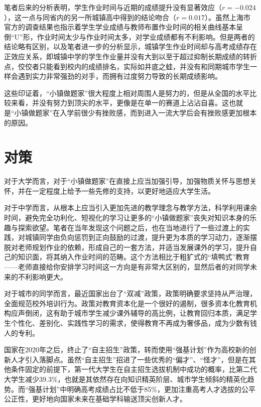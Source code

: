 \documentclass[10pt,a4paper,heading=false]{ctexart}
\begin{document}
    笔者后来的分析表明，学生作业时间与近期的成绩提升没有显著效应（$r=-0.024$）\cite{planstormrelation}，这一点与同省内的另一所城镇高中得到的结论吻合（$r=0.017$）\cite{phyquantity}。虽然上海市官方的调查结果也指示着学生学业成绩与教师布置作业时间的相关曲线基本呈倒“U”形，作业时间太少与作业时间太多，对学业成绩都有不利影响\cite{shanghaihome}。但是两者的结论略有区别，以及笔者进一步的分析显示，城镇学生作业时间却与高考成绩存在正效应关系\cite{planstormrelation}，即城镇中学的学生作业量并没有大到以至于超过抑制长期成绩的转折点，佼佼者只能看到校内的成绩排名，实际如井底之蛙，并没有和同期城市学生一样会遇到实力非常强劲的对手，而拥有过度努力导致的长期成绩影响。

    这些印证着，“小镇做题家”很大程度上相对周围人是努力的，但是从全国的水平比较来看，并没有努力到顶尖的水平，更像是在单一的赛道上沾沾自喜。这也就是“小镇做题家”在入学前很少有挫败感，而到进入一流大学后会有挫败感更加根本的原因。
    \section{对策}

    对于大学而言，对于“小镇做题家”在直接上应当加强引导，加强物质关怀与思想关怀，并在一定程度上给予一些先修的支持，以更好地适应大学生活。
    
    对于中学而言，从根本上应当引入更加先进的教学理念与教学方法，科学利用课余时间，避免完全功利化、短视化的学习让更多的“小镇做题家”丧失对知识本身的乐趣与探索欲望。笔者在当年发现这个问题之后，也在当地进行了一些过渡上的实践\cite{planstormtech}，对城镇同学由负向惩罚到正向鼓励的过渡，提升更为本质的学习动力，逐渐摆脱对老师规划作业的依赖，形成自己的一套方法，并适当发展课外的学习，提升自己的知识面，将其纳入作业时间的范畴。这个方法相比于粗犷式的“填鸭式”教育------老师直接给你安排学习时间这一方向是有非常大区别的，显然后者的对同学未来的不利影响更大。

    对于城市的同学而言，最近国家出台了“双减”政策\cite{doublereduction}，政策明确要求坚持从严治理，全面规范校外培训行为。政策对教育资本化是一个很好的遏制，很多资本化教育机构应声倒闭，这有助于城市学生减少课外辅导的高比例，让教育回归本质，满足学生个性化、差别化、实践性学习的需求，使得教育不再成为奢侈品，成为少数有钱人的专利\cite{revolution}。

    国家在2020年之后，终止了“自主招生”政策，转而使用“强基计划”作为高校新的创新人才引入落脚点。虽然“自主招生”招进了一些优秀的“偏才”、“怪才”，但是在其他条件固定的前提下，第一代大学生在自主招生选拔机制中成功的概率，比第二代大学生减少39.3\%，也就是其依然存在向知识精英阶层、城市学生倾斜的精英化趋势\cite{fair}。而“强基计划”中明确高考成绩占比不低于85\%，更加注重高考人才选拔的公平公正性，更好地向国家未来在基础学科输送顶尖创新人才\cite{newrev}。
\end{document}
